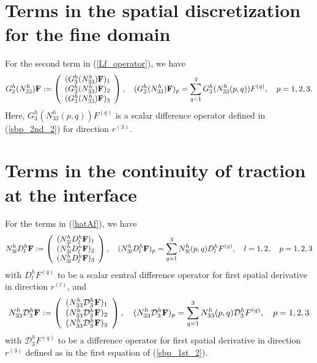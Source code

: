 \section{Terms in the spatial discretization for the fine domain}\label{appendix_fdomain}
For the second term in (\ref{Lf_operator}), we have
\begin{align*}
{{G}}_3^{h}({N}_{33}^{h}){\bf F} := \left(\begin{array}{c}
({{G}}_3^{h}({N}_{33}^{h}){\bf F})_1 \\
({{G}}_3^{h}({N}_{33}^{h}){\bf F})_2 \\
({{G}}_3^{h}({N}_{33}^{h}){\bf F})_3 
\end{array}\right), \quad ({{G}}_3^{h}({N}_{33}^{h}){\bf F})_p = \sum_{q = 1}^{3} {G}_3^{h}(N_{33}^{h}(p,q)) {F}^{(q)},\quad p = 1,2,3.
\end{align*}
Here, ${G}_3^{h}(N_{33}^{h}(p,q)) {F}^{(q)}$ is a scalar difference operator defined in (\ref{sbp_2nd_2}) for direction $r^{(3)}$. 

\section{Terms in the continuity of traction at the interface}\label{traction_f}
For the terms in (\ref{hatAf}), we have
\begin{align}\label{gamma_D} 
{N}_{3l}^hD_l^h{\bf F} := \left(\begin{array}{c}
({N}_{3l}^hD_l^h{\bf F})_1 \\
({N}_{3l}^hD_l^h{\bf F})_2 \\
({N}_{3l}^hD_l^h{\bf F})_3 
\end{array}\right), \quad ({N}_{3l}^hD_l^h{\bf F})_p = \sum_{q = 1}^{3} N_{3l}^h(p,q)D_l^h{F}^{(q)},\quad l = 1,2, \quad p = 1,2,3
\end{align}
with $D_l^h{F}^{(q)}$ to be a scalar central difference operator for first spatial derivative in direction $r^{(l)}$, and
\begin{align*}
{N}_{33}^h\mathcal{D}_3^h{\bf F} := \left(\begin{array}{c}
({N}_{33}^h\mathcal{D}_3^h{\bf F})_1 \\
({N}_{33}^h\mathcal{D}_3^h{\bf F})_2 \\
({N}_{33}^h\mathcal{D}_3^h{\bf F})_3 
\end{array}\right), \quad ({N}_{33}^h\mathcal{D}_3^h{\bf F})_p = \sum_{q = 1}^{3} N_{33}^h(p,q)\mathcal{D}_3^h{F}^{(q)},\quad p = 1,2,3
\end{align*}
with $\mathcal{D}_3^h{F}^{(q)}$ to be a difference operator for first spatial derivative in direction $r^{(3)}$ defined as in the first equation of (\ref{sbp_1st_2}).

